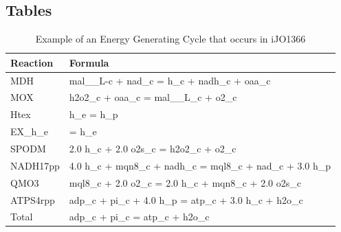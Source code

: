 \documentclass[twocolumn]{bmcart}%
\begin{document}
\begin{backmatter}




\section*{Tables}

\begin{table}[h!]
\caption{Example of an Energy Generating Cycle that occurs in iJO1366}
\begin{tabular}{l|l}
\label{table:egc_example}
Reaction & Formula\\\hline
MDH & mal\_\_L-c + nad\_c = h\_c + nadh\_c + oaa\_c\\
MOX	& h2o2\_c + oaa\_c = mal\_\_L\_c + o2\_c\\
Htex	& h\_e = h\_p\\
EX\_h\_e & = h\_e\\
SPODM & 2.0 h\_c + 2.0 o2s\_c = h2o2\_c + o2\_c\\
NADH17pp & 4.0 h\_c + mqn8\_c + nadh\_c = mql8\_c + nad\_c + 3.0 h\_p\\
QMO3 & mql8\_c + 2.0 o2\_c = 2.0 h\_c + mqn8\_c + 2.0 o2s\_c\\
ATPS4rpp & adp\_c + pi\_c + 4.0 h\_p = atp\_c + 3.0 h\_c + h2o\_c\\\hline
Total & adp\_c + pi\_c = atp\_c + h2o\_c
\end{tabular}
\end{table}



\end{backmatter}
\end{document}
